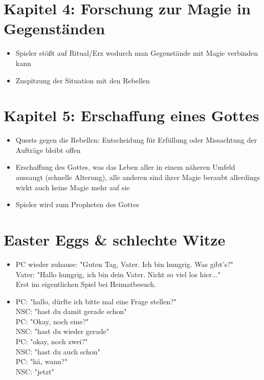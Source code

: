 \section{Kapitel 4: Forschung zur Magie in Gegenständen}
\begin{itemize}
	\item Spieler stößt auf Ritual/Erz wodurch man Gegenstände mit Magie verbinden kann
	\item Zuspitzung der Situation mit den Rebellen
\end{itemize}
\section{Kapitel 5: Erschaffung eines Gottes}
\begin{itemize}
	\item Quests gegen die Rebellen: Entscheidung für Erfüllung oder Missachtung der Aufträge bleibt offen
	\item Erschaffung des Gottes, was das Leben aller in einem näheren Umfeld aussaugt (schnelle Alterung), alle anderen sind ihrer Magie beraubt allerdings wirkt auch keine Magie mehr auf sie
	\item Spieler wird zum Propheten des Gottes
\end{itemize}

\section{Easter Eggs \& schlechte Witze}
\begin{itemize}
	\item PC wieder zuhause: "Guten Tag, Vater. Ich bin hungrig. Was gibt's?" \\ Vater: "Hallo hungrig, ich bin dein Vater. Nicht so viel los hier..." \\ Erst im eigentlichen Spiel bei Heimatbesuch.
	\item  PC: "hallo, dürfte ich bitte mal eine Frage stellen?" \\ NSC: "hast du damit gerade schon" \\ PC: "Okay, noch eine?" \\ NSC: "hast  du wieder gerade" \\ PC: "okay, noch zwei?" \\ NSC: "hast du auch schon" \\ PC: "hä, wann?" \\ NSC: "jetzt"
\end{itemize}